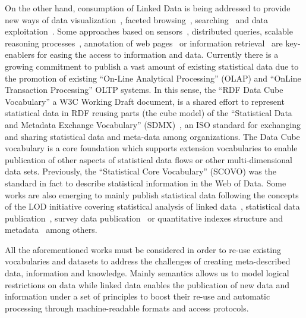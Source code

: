 On the other hand, consumption of Linked Data is being addressed to provide new ways of data 
visualization~\cite{DBLP:journals/semweb/DadzieR11}, faceted browsing~\cite{citeulike:8529753}, 
searching~\cite{hoga-etal-2011-swse-JWS} and data exploitation~\cite{Harth:2011:SIP:1963192.1963318}. Some approaches 
based on sensors~\cite{Jeung:2010:EMM:1850003.1850235}, distributed queries\cite{Hartig09executingsparql}, 
scalable reasoning processes~\cite{DBLP:journals/ws/UrbaniKMHB12}, annotation of web pages~\cite{rdfa-primer} or information retrieval~\cite{Pound} are key-enablers for easing the access 
to information and data. Currently there is a growing commitment to publish a vast amount of existing statistical data due to 
the promotion of existing ``On-Line Analytical Processing'' (OLAP) and ``OnLine Transaction Processing'' OLTP systems. 
In this sense, the ``RDF Data Cube Vocabulary'' a W3C Working Draft document, is a shared effort to 
represent statistical data in RDF reusing parts (the cube model) of the ``Statistical Data and Metadata Exchange Vocabulary'' (SDMX)~\cite{sdmx}, an ISO standard 
for exchanging and sharing statistical data and meta-data among organizations. The Data Cube vocabulary is a core 
foundation which supports extension vocabularies to enable publication of other aspects of statistical data flows or 
other multi-dimensional data sets. Previously, the ``Statistical Core Vocabulary'' (SCOVO) was the standard in 
fact to describe statistical information in the Web of Data. Some works are also emerging to mainly publish statistical data 
following the concepts of the LOD initiative covering statistical analysis of linked data~\cite{DBLP:conf/semweb/ZapilkoM11}, 
statistical data publication~\cite{DBLP:journals/ijsc/SalasMBCMA12}, survey data publication~\cite{DDI2013,DBLP:conf/dgo/FernandezMG11} or 
quantitative indexes structure and metadata~\cite{webindexlod} among others.

All the aforementioned works must be considered in order to re-use existing vocabularies and datasets to address 
the challenges of creating meta-described data, information and knowledge. Mainly semantics allows us to model logical restrictions 
on data while linked data enables the publication of new data and information under a set of principles 
to boost their re-use and automatic processing through machine-readable formats and access protocols.


